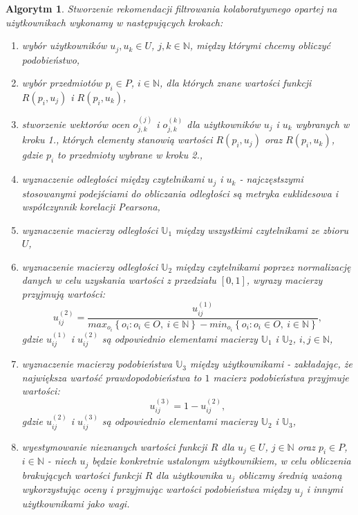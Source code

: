 \documentclass[12pt,a4paper]{report}
\newtheorem{algorytm}[df]{Algorytm}
\newcommand{\set}[1]{\left\lbrace {#1} \right\rbrace}
\newcommand{\setN}{\mathbb{N}}
\newcommand{\setUzytkownicy}{\mathit{U}}
\newcommand{\setPrzedmioty}{\mathit{P}}
\newcommand{\setOceny}{\mathit{O}}
\begin{document}
\begin{algorytm}
Stworzenie rekomendacji filtrowania kolaboratywnego opartej na użytkownikach wykonamy w następujących krokach:
\begin{enumerate}
\item wybór użytkowników $u_j, u_k \in \setUzytkownicy$, $j,k \in \setN$, między którymi chcemy obliczyć podobieństwo,
\item wybór przedmiotów $p_i \in \setPrzedmioty$, $i \in \setN$, dla których znane wartości funkcji $R(p_i,u_j)$ i $R(p_i,u_k)$,
\item stworzenie wektorów ocen $o_{j,k}^{(j)}$ i $o_{j,k}^{(k)}$ dla użytkowników $u_j$ i $u_k$ wybranych w kroku 1., których elementy stanowią wartości $R(p_i,u_j)$ oraz $R(p_i,u_k)$, gdzie $p_i$ to przedmioty wybrane w kroku 2.,
\item wyznaczenie odległości między czytelnikami $u_j$ i $u_k$ - najczęstszymi stosowanymi podejściami do obliczania odległości są metryka euklidesowa i współczynnik korelacji Pearsona,
\item wyznaczenie macierzy odległości $\mathbb{U}_1$ między wszystkimi czytelnikami ze zbioru $\setUzytkownicy$,
\item wyznaczenie macierzy odległości $\mathbb{U}_2$ między czytelnikami poprzez normalizację danych w celu uzyskania wartości z przedziału $[0,1]$, wyrazy macierzy przyjmują wartości:
$$
u_{ij}^{(2)} = \frac{u_{ij}^{(1)}}{max_{o_i} \set{o_i : o_i \in \setOceny,\: i \in \setN } - min_{o_i} \set{o_i : o_i \in \setOceny, \: i \in \setN}},
$$
gdzie $u_{ij}^{(1)}$ i $u_{ij}^{(2)}$ są odpowiednio elementami macierzy $\mathbb{U}_1$ i $\mathbb{U}_2$, $i,j \in \setN$,
\item wyznaczenie macierzy podobieństwa $\mathbb{U}_3$ między użytkownikami - zakładając, że największa wartość prawdopodobieństwa to $1$ macierz podobieństwa przyjmuje wartości:
$$
u_{ij}^{(3)} = 1 - u_{ij}^{(2)},
$$
gdzie $u_{ij}^{(2)}$ i $u_{ij}^{(3)}$ są odpowiednio elementami macierzy $\mathbb{U}_2$ i $\mathbb{U}_3$,
\item wyestymowanie nieznanych wartości funkcji $R$ dla $u_j \in \setUzytkownicy$, $j \in \setN$ oraz $p_i \in \setPrzedmioty$, $i \in \setN$  - niech $u_j$ będzie konkretnie ustalonym użytkownikiem, w celu obliczenia brakujących wartości funkcji $R$ dla użytkownika $u_j$ obliczmy średnią ważoną wykorzystując oceny i przyjmując wartości podobieństwa między $u_j$ i innymi użytkownikami jako wagi.
\end{enumerate}
\end{algorytm}
\end{document}
